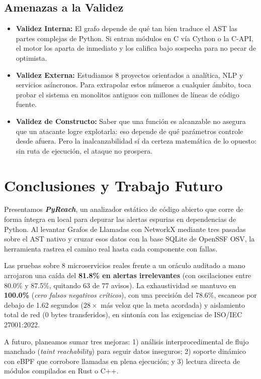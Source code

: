 \documentclass[conference]{IEEEtran}
\begin{document}
\subsection{Amenazas a la Validez}
\begin{itemize}
    \item \textbf{Validez Interna:} El grafo depende de qué tan bien traduce el AST las partes complejas de Python. Si entran módulos en C vía Cython o la C-API, el motor los aparta de inmediato y los califica bajo sospecha para no pecar de optimista.
    \item \textbf{Validez Externa:} Estudiamos 8 proyectos orientados a analítica, NLP y servicios asíncronos. Para extrapolar estos números a cualquier ámbito, toca probar el sistema en monolitos antiguos con millones de líneas de código fuente.
    \item \textbf{Validez de Constructo:} Saber que una función es alcanzable no asegura que un atacante logre explotarla: eso depende de qué parámetros controle desde afuera. Pero la inalcanzabilidad sí da certeza matemática de lo opuesto: sin ruta de ejecución, el ataque no prospera.
\end{itemize}

\section{Conclusiones y Trabajo Futuro}
Presentamos \textbf{\textit{PyReach}}, un analizador estático de código abierto que corre de forma íntegra en local para depurar las alertas espurias en dependencias de Python. Al levantar Grafos de Llamadas con NetworkX mediante tres pasadas sobre el AST nativo y cruzar esos datos con la base SQLite de OpenSSF OSV, la herramienta rastrea el camino real hasta cada componente con fallas.

Las pruebas sobre 8 microservicios reales frente a un oráculo auditado a mano arrojaron una caída del \textbf{81.8\% en alertas irrelevantes} (con oscilaciones entre 80.0\% y 87.5\%, quitando 63 de 77 avisos). La exhaustividad se mantuvo en \textbf{100.0\%} (\textit{cero falsos negativos críticos}), con una precisión del 78.6\%, escaneos por debajo de 1.62 segundos ($28\times$ más veloz que la meta acordada) y aislamiento total de red (0 bytes transferidos), en sintonía con las exigencias de ISO/IEC 27001:2022.

A futuro, planeamos sumar tres mejoras: 1) análisis interprocedimental de flujo manchado (\textit{taint reachability}) para seguir datos inseguros; 2) soporte dinámico con eBPF que corrobore llamadas en plena ejecución; y 3) lectura directa de módulos compilados en Rust o C++.



\end{document}
